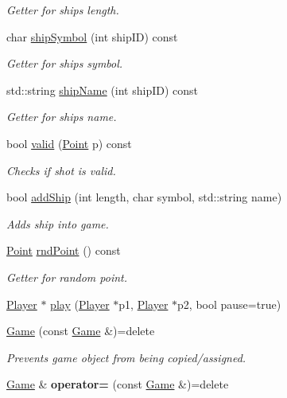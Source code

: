 \begin{DoxyCompactItemize}
\begin{DoxyCompactList}\small\item\em Getter for ship\textquotesingle{}s length. \end{DoxyCompactList}\item 
char \mbox{\hyperlink{class_game_a4d7e709c85b6abd5defa24f5f78cd1d1}{ship\+Symbol}} (int ship\+ID) const
\begin{DoxyCompactList}\small\item\em Getter for ship\textquotesingle{}s symbol. \end{DoxyCompactList}\item 
std\+::string \mbox{\hyperlink{class_game_aa652b00557acd25657c4aeface33d29a}{ship\+Name}} (int ship\+ID) const
\begin{DoxyCompactList}\small\item\em Getter for ship\textquotesingle{}s name. \end{DoxyCompactList}\item 
bool \mbox{\hyperlink{class_game_a3ec9ae2ce5d1ac1cbf4ed18aa7141744}{valid}} (\mbox{\hyperlink{class_point}{Point}} p) const
\begin{DoxyCompactList}\small\item\em Checks if shot is valid. \end{DoxyCompactList}\item 
bool \mbox{\hyperlink{class_game_a3ac4fd5a820cafec68f05cc81c26492a}{add\+Ship}} (int length, char symbol, std\+::string name)
\begin{DoxyCompactList}\small\item\em Adds ship into game. \end{DoxyCompactList}\item 
\mbox{\hyperlink{class_point}{Point}} \mbox{\hyperlink{class_game_acd99c992d69fe990abfb16ab1bde177c}{rnd\+Point}} () const
\begin{DoxyCompactList}\small\item\em Getter for random point. \end{DoxyCompactList}\item 
\mbox{\hyperlink{class_player}{Player}} $\ast$ \mbox{\hyperlink{class_game_a9102360e66754f58044c93d80260f6d0}{play}} (\mbox{\hyperlink{class_player}{Player}} $\ast$p1, \mbox{\hyperlink{class_player}{Player}} $\ast$p2, bool pause=true)
\item 
\mbox{\label{class_game_abb28875d74d25fa9e0dcdbe37c6ad89c}} 
\mbox{\hyperlink{class_game_abb28875d74d25fa9e0dcdbe37c6ad89c}{Game}} (const \mbox{\hyperlink{class_game}{Game}} \&)=delete
\begin{DoxyCompactList}\small\item\em Prevents game object from being copied/assigned. \end{DoxyCompactList}\item 
\mbox{\label{class_game_a4d0c0503733cc50b0b5cb8d7ef1237ec}} 
\mbox{\hyperlink{class_game}{Game}} \& {\bfseries operator=} (const \mbox{\hyperlink{class_game}{Game}} \&)=delete
\end{DoxyCompactItemize}


